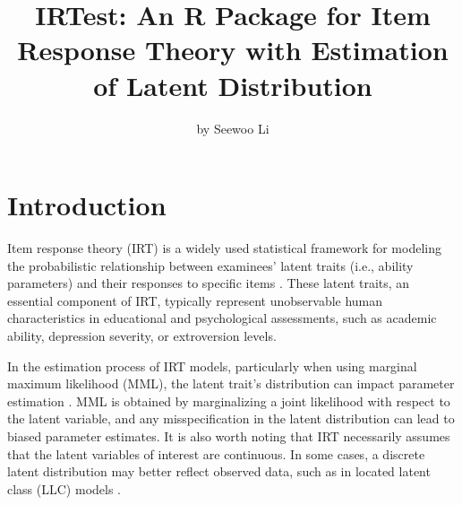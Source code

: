 \title{IRTest: An R Package for Item Response Theory with Estimation of Latent Distribution}


\author{by Seewoo Li}

\maketitle


\hypertarget{introduction}{%
\section{Introduction}\label{introduction}}

Item response theory (IRT) is a widely used statistical framework for modeling
the probabilistic relationship between examinees' latent traits
(i.e., ability parameters) and their responses to specific items
\citep{deAyala:2009, Hambleton+Swaminathan+Rogers:1991, vanderLinden:2016}.
These latent traits, an essential component of IRT, typically represent unobservable
human characteristics in educational and psychological assessments,
such as academic ability, depression severity, or extroversion levels.

In the estimation process of IRT models, particularly when using marginal maximum likelihood (MML),
the latent trait's distribution can impact parameter estimation \citep{Woods:2015}.
MML is obtained by marginalizing a joint likelihood with respect to the latent variable,
and any misspecification in the latent distribution can lead to biased parameter estimates.
It is also worth noting that IRT necessarily assumes that the latent variables of interest are continuous.
In some cases, a discrete latent distribution may better reflect observed data,
such as in located latent class (LLC) models \citep[see][]{Clogg:1981, Follmann:1988, Haberman:2005, McCutcheon:1987, Xu+vonDavier:2008}.

